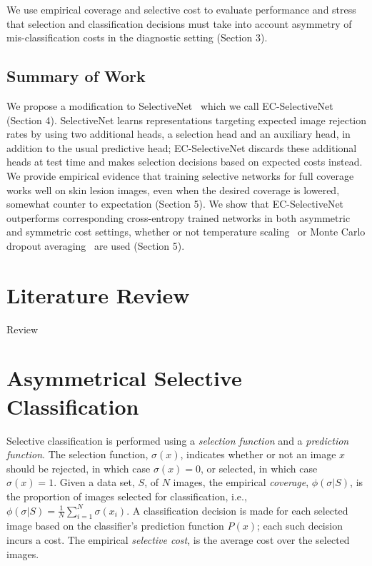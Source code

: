 We use empirical coverage and selective cost to evaluate performance and stress that selection and classification decisions must take into account asymmetry of mis-classification costs in the diagnostic setting (Section 3). 

\subsection{Summary of Work}
\label{subsec:selective_summary_of_work}
We propose a modification to SelectiveNet~\citep{Geifman2019} which we call EC-SelectiveNet (Section 4). SelectiveNet learns representations targeting expected image rejection rates by using two additional heads, a selection head and an auxiliary head, in addition to the usual predictive head; EC-SelectiveNet discards these additional heads at test time and makes selection decisions based on expected costs instead. 
We provide empirical evidence that training selective networks for full coverage works well on skin lesion images, even when the desired coverage is lowered, somewhat counter to expectation (Section 5). We show that EC-SelectiveNet outperforms corresponding cross-entropy trained networks in both asymmetric and symmetric cost settings, whether or not temperature scaling~\citep{guo2017calibration} or Monte Carlo dropout averaging~\citep{Gal2016} are used (Section 5).



\section{Literature Review}
\label{sec:selective_review}
Review



\section{Asymmetrical Selective Classification}
\label{sec:selective_classification}
Selective classification is performed using a {\em selection function} and a {\em prediction function}. The selection function, $\sigma(x)$, indicates whether or not an image $x$ should be rejected, in which case $\sigma(x)=0$, or selected, in which case $\sigma(x)=1$. Given a data set, $S$, of $N$ images, the empirical {\em coverage}, $\phi(\sigma|S)$, is the proportion of images selected for classification, i.e.,  $\phi(\sigma|S) = \frac{1}{N} \sum_{i=1}^{N} \sigma(x_i)$. A classification decision is made for each selected image based on the classifier's prediction function $P(x)$; each such decision incurs a cost. The empirical {\em selective cost}, is the average cost over the selected images.

